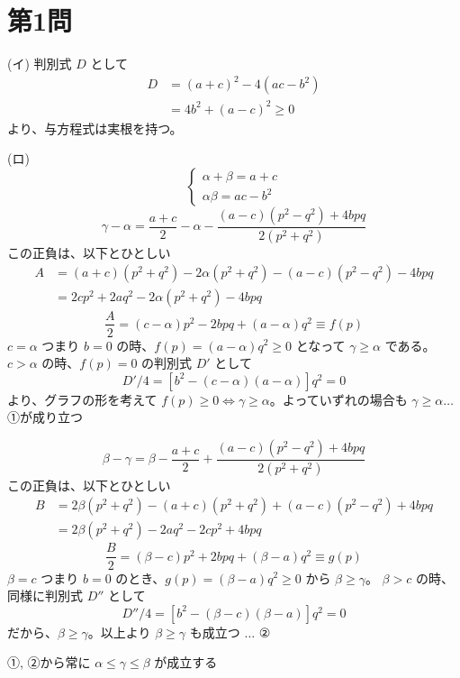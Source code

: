 \documentclass[../main.tex]{subfiles}
\begin{document}
\section*{第1問}

\noindent
[\textbf{解}] (イ) 判別式 $D$ として
\begin{align*}
  D &= (a+c)^2 - 4(ac-b^2) \\
  &= 4b^2 + (a-c)^2 \ge 0
\end{align*}
より、与方程式は実根を持つ。 \quad {}

\vspace{0.5cm}

\noindent
(ロ)
\[
  \begin{cases}
    \alpha + \beta = a + c \\
    \alpha \beta = ac - b^2
  \end{cases}
\]
\[
  \gamma - \alpha = \frac{a+c}{2} - \alpha - \frac{(a-c)(p^2-q^2)+4bpq}{2(p^2+q^2)}
\]
この正負は、以下とひとしい
\begin{align*}
  A &= (a+c)(p^2+q^2) - 2\alpha(p^2+q^2) - (a-c)(p^2-q^2) - 4bpq \\
  &= 2cp^2 + 2aq^2 - 2\alpha(p^2+q^2) - 4bpq
\end{align*}
\[
  \frac{A}{2} = (c-\alpha)p^2 - 2bpq + (a-\alpha)q^2 \equiv f(p)
\]
$c = \alpha$ つまり $b=0$ の時、$f(p) = (a-\alpha)q^2 \ge 0$ となって $\gamma \ge \alpha$ である。 $c > \alpha$ の時、$f(p)=0$ の判別式 $D'$ として
\[
  D'/4 = [b^2 - (c-\alpha)(a-\alpha)]q^2 = 0
\]
より、グラフの形を考えて $f(p) \ge 0 \iff \gamma \ge \alpha$。よっていずれの場合も $\gamma \ge \alpha \dots$ ①が成り立つ

\[
  \beta - \gamma = \beta - \frac{a+c}{2} + \frac{(a-c)(p^2-q^2)+4bpq}{2(p^2+q^2)}
\]
この正負は、以下とひとしい
\begin{align*}
  B &= 2\beta(p^2+q^2) - (a+c)(p^2+q^2) + (a-c)(p^2-q^2) + 4bpq \\
  &= 2\beta(p^2+q^2) - 2aq^2 - 2cp^2 + 4bpq
\end{align*}
\[
  \frac{B}{2} = (\beta-c)p^2 + 2bpq + (\beta-a)q^2 \equiv g(p)
\]
$\beta = c$ つまり $b=0$ のとき、$g(p) = (\beta-a)q^2 \ge 0$ から $\beta \ge \gamma$。 $\beta > c$ の時、同様に判別式 $D''$ として
\[
  D''/4 = [b^2 - (\beta-c)(\beta-a)]q^2 = 0
\]
だから、$\beta \ge \gamma$。以上より $\beta \ge \gamma$ も成立つ $\dots$ ②

\noindent
①, ②から常に $\alpha \le \gamma \le \beta$ が成立する \quad {}
\end{document}
